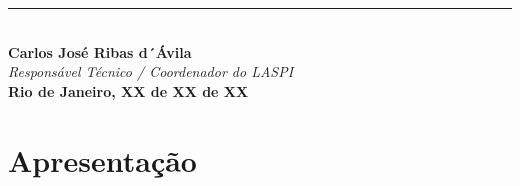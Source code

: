 \documentclass[12pt, a4paper]{article}
\begin{document}
\begin{titlepage}
    \vfill %

    \vfill %
    
    \begin{center} 
        \begin{minipage}{0.8\textwidth}
            \centering %
            \vspace{1.5cm} 
            \rule{10cm}{0.4pt} \\
            \textbf{Carlos José Ribas d´Ávila} \\
            \textit{Responsável Técnico / Coordenador do LASPI} \\
            \vspace{1cm}
            \textbf{Rio de Janeiro, XX de XX de XX}
        \end{minipage}
    \end{center}
    
    \vfill %

\end{titlepage}

\tableofcontents
\cleardoublepage %

\listoffigures   
\cleardoublepage %

\listoftables    
\cleardoublepage %

\lstlistoflistings 
\cleardoublepage %

\newpage         %

\section*{Apresentação}
\end{document}
